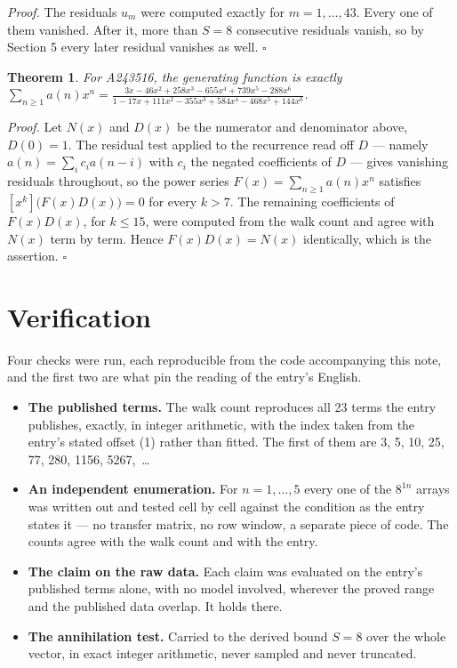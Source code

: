\documentclass[11pt]{article}
\newtheorem{theorem}{Theorem}
\theoremstyle{definition}
\begin{document}
{\itshape Proof.} The residuals $u_m$ were computed exactly for $m = 1,\dots,43$. Every one of them vanished. After it, more than $S = 8$ consecutive residuals vanish, so by Section 5 every later residual vanishes as well. $\square$

\begin{theorem} For A243516, the generating function is exactly $\sum_{n\ge 1} a(n)x^n = \frac{3x - 46x^{2} + 258x^{3} - 655x^{4} + 739x^{5} - 288x^{6}}{1 - 17x + 111x^{2} - 355x^{3} + 584x^{4} - 468x^{5} + 144x^{6}}$.\end{theorem}

{\itshape Proof.} Let $N(x)$ and $D(x)$ be the numerator and denominator above, $D(0)=1$. The residual test applied to the recurrence read off $D$ --- namely $a(n) = \sum_i c_i a(n-i)$ with $c_i$ the negated coefficients of $D$ --- gives vanishing residuals throughout, so the power series $F(x)=\sum_{n\ge 1}a(n)x^n$ satisfies $[x^k]\bigl(F(x)D(x)\bigr) = 0$ for every $k > 7$. The remaining coefficients of $F(x)D(x)$, for $k \le 15$, were computed from the walk count and agree with $N(x)$ term by term. Hence $F(x)D(x) = N(x)$ identically, which is the assertion. $\square$

\section{Verification}

Four checks were run, each reproducible from the code accompanying this note, and the first two are what pin the reading of the entry's English.

\begin{itemize}

\item {\bfseries The published terms.} The walk count reproduces all 23 terms the entry publishes, exactly, in integer arithmetic, with the index taken from the entry's stated offset (1) rather than fitted. The first of them are 3, 5, 10, 25, 77, 280, 1156, 5267,~\dots

\item {\bfseries An independent enumeration.} For $n = 1,\dots,5$ every one of the $8^{1n}$ arrays was written out and tested cell by cell against the condition as the entry states it --- no transfer matrix, no row window, a separate piece of code. The counts agree with the walk count and with the entry.

\item {\bfseries The claim on the raw data.} Each claim was evaluated on the entry's published terms alone, with no model involved, wherever the proved range and the published data overlap. It holds there.

\item {\bfseries The annihilation test.} Carried to the derived bound $S = 8$ over the whole vector, in exact integer arithmetic, never sampled and never truncated.

\end{itemize}
\end{document}
